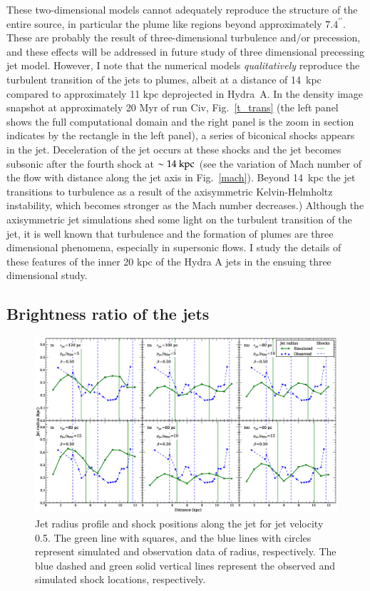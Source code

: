 These two-dimensional models cannot adequately reproduce the structure of the entire source, in particular the plume like regions beyond approximately $7.4^{\prime\prime}$. These are probably the result of three-dimensional turbulence and/or precession, and these effects will be addressed in future study of three dimensional precessing jet model. However, I note that the numerical models \emph{qualitatively} reproduce the turbulent transition of the jets to plumes, albeit at a distance of 14~kpc compared to approximately 11 kpc deprojected in Hydra~A. In the density image snapshot at approximately 20 Myr of run Civ, Fig.~\ref{t_trans} (the left panel shows the full computational domain and the right panel is the zoom in section indicates by the rectangle in the left panel), a series of biconical  shocks appears in the jet.  Deceleration of the jet occurs at these shocks and the jet becomes subsonic after the fourth shock at $\sim 14 \rm \ kpc$ (see the variation of Mach number of the flow with distance along the jet axis in Fig.~\ref{mach}). Beyond 14~kpc the jet transitions to turbulence as a result of the axisymmetric Kelvin-Helmholtz instability, which becomes stronger as the Mach number decreases.) 
Although the axisymmetric jet simulations shed some light on the turbulent transition of the jet, it is well known that turbulence and the formation of plumes are three dimensional phenomena, especially in supersonic flows. I study the details of these features of the inner 20 kpc of the Hydra A jets in the ensuing three dimensional study.


%
%

\subsection{Brightness ratio of the jets} \label{s:b_r}
 \begin{figure}
\centering
\includegraphics[width=\textwidth]{clv.eps}
\caption{Jet radius profile and shock positions along the jet for jet velocity 0.5. The green line with squares, and the blue lines with circles represent simulated and observation data of radius, respectively. The blue dashed and green solid vertical lines represent the observed and simulated shock locations, respectively.}
\label{f:p_s_b5}
\end{figure}




